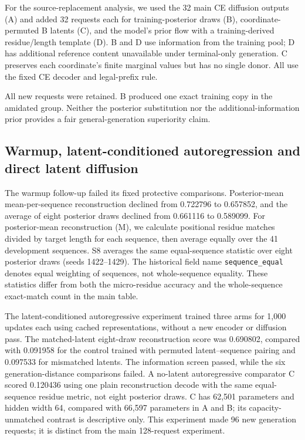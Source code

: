 \documentclass[11pt,a4paper]{article}
\begin{document}
For the source-replacement analysis, we used the 32 main CE diffusion outputs (A) and added 32 requests each for training-posterior draws (B), coordinate-permuted B latents (C), and the model's prior flow with a training-derived residue/length template (D). B and D use information from the training pool; D has additional reference content unavailable under terminal-only generation. C preserves each coordinate's finite marginal values but has no single donor. All use the fixed CE decoder and legal-prefix rule.

All new requests were retained. B produced one exact training copy in the amidated group. Neither the posterior substitution nor the additional-information prior provides a fair general-generation superiority claim.

\subsection*{Warmup, latent-conditioned autoregression and direct latent diffusion}
The warmup follow-up failed its fixed protective comparisons. Posterior-mean mean-per-sequence reconstruction declined from 0.722796 to 0.657852, and the average of eight posterior draws declined from 0.661116 to 0.589099. For posterior-mean reconstruction (M), we calculate positional residue matches divided by target length for each sequence, then average equally over the 41 development sequences. S8 averages the same equal-sequence statistic over eight posterior draws (seeds 1422--1429). The historical field name \texttt{sequence\_equal} denotes equal weighting of sequences, not whole-sequence equality. These statistics differ from both the micro-residue accuracy and the whole-sequence exact-match count in the main table.

The latent-conditioned autoregressive experiment trained three arms for 1,000 updates each using cached representations, without a new encoder or diffusion pass. The matched-latent eight-draw reconstruction score was 0.690802, compared with 0.091958 for the control trained with permuted latent--sequence pairing and 0.097533 for mismatched latents. The information screen passed, while the six generation-distance comparisons failed. A no-latent autoregressive comparator C scored 0.120436 using one plain reconstruction decode with the same equal-sequence residue metric, not eight posterior draws. C has 62,501 parameters and hidden width 64, compared with 66,597 parameters in A and B; its capacity-unmatched contrast is descriptive only. This experiment made 96 new generation requests; it is distinct from the main 128-request experiment.
\end{document}
